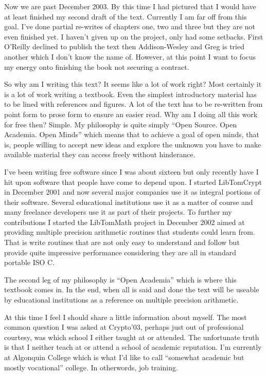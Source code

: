 \documentclass[b5paper]{book}
\begin{document}
Now we are past December 2003.  By this time I had pictured that I would have at least finished my second draft of the text.  
Currently I am far off from this goal.  I've done partial re-writes of chapters one, two and three but they are not even
finished yet.  I haven't given up on the project, only had some setbacks.  First O'Reilly declined to publish the text then
Addison-Wesley and Greg is tried another which I don't know the name of.  However, at this point I want to focus my energy
onto finishing the book not securing a contract.

So why am I writing this text?  It seems like a lot of work right?  Most certainly it is a lot of work writing a textbook.  
Even the simplest introductory material has to be lined with references and figures.  A lot of the text has to be re-written
from point form to prose form to ensure an easier read.  Why am I doing all this work for free then?  Simple. My philosophy
is quite simply ``Open Source.  Open Academia.  Open Minds'' which means that to achieve a goal of open minds, that is,
people willing to accept new ideas and explore the unknown you have to make available material they can access freely 
without hinderance.  

I've been writing free software since I was about sixteen but only recently have I hit upon software that people have come
to depend upon.  I started LibTomCrypt in December 2001 and now several major companies use it as integral portions of their
software.  Several educational institutions use it as a matter of course and many freelance developers use it as
part of their projects.  To further my contributions I started the LibTomMath project in December 2002 aimed at providing
multiple precision arithmetic routines that students could learn from.  That is write routines that are not only easy
to understand and follow but provide quite impressive performance considering they are all in standard portable ISO C.  

The second leg of my philosophy is ``Open Academia'' which is where this textbook comes in.  In the end, when all is
said and done the text will be useable by educational institutions as a reference on multiple precision arithmetic.  

At this time I feel I should share a little information about myself.  The most common question I was asked at 
Crypto'03, perhaps just out of professional courtesy, was which school I either taught at or attended.  The unfortunate
truth is that I neither teach at or attend a school of academic reputation.  I'm currently at Algonquin College which 
is what I'd like to call ``somewhat academic but mostly vocational'' college.  In otherwords, job training.
\end{document}
